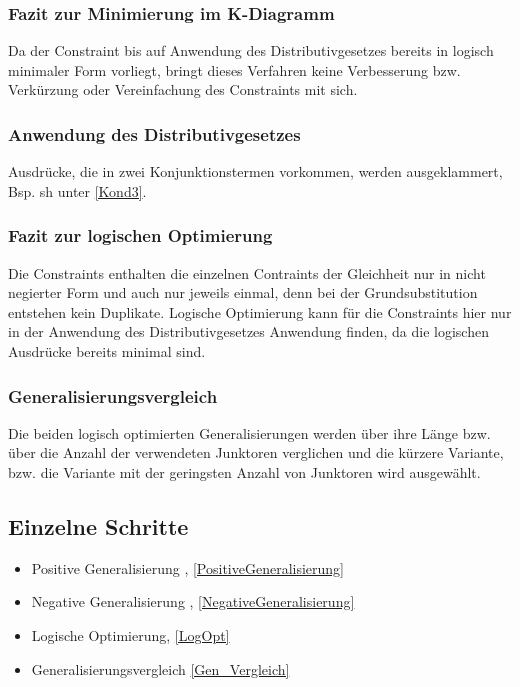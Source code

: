 \documentclass[a4paper, 11pt]{book}
\begin{document}
		\subsubsection{Fazit zur Minimierung im K-Diagramm}
		Da der Constraint bis auf Anwendung des Distributivgesetzes bereits in logisch minimaler Form vorliegt, bringt dieses Verfahren keine Verbesserung bzw. Verkürzung oder Vereinfachung des Constraints mit sich.
		\subsubsection{Anwendung des Distributivgesetzes}
		Ausdrücke, die in zwei Konjunktionstermen vorkommen, werden ausgeklammert, Bsp. sh unter \ref{Kond3}.
		\subsubsection{\large{ Fazit zur logischen Optimierung}}
		 Die Constraints enthalten die einzelnen Contraints der Gleichheit nur in nicht negierter Form und auch nur jeweils einmal, denn bei der Grundsubstitution entstehen kein Duplikate. 
		 Logische Optimierung kann für die Constraints hier nur in der Anwendung des Distributivgesetzes Anwendung finden, da die logischen Ausdrücke bereits minimal sind.	
		 \subsubsection{Generalisierungsvergleich}  \label{Gen_Vergleich}
		 Die beiden logisch optimierten Generalisierungen werden über ihre Länge bzw. über die Anzahl der verwendeten Junktoren verglichen und die kürzere Variante, bzw. die Variante mit der geringsten Anzahl von Junktoren wird ausgewählt.

\subsection{Einzelne Schritte}
\begin{itemize}
	\item Positive Generalisierung , \ref{PositiveGeneralisierung}
	\item Negative Generalisierung , \ref{NegativeGeneralisierung}
	\item Logische Optimierung, \ref{LogOpt}
	\item Generalisierungsvergleich \ref{Gen_Vergleich}
\end{itemize}
\end{document}
